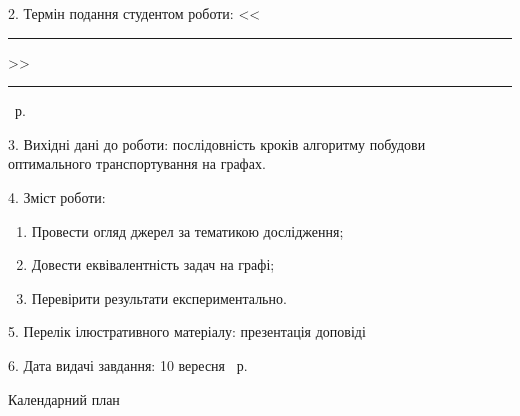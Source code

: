 2. Термін подання студентом роботи: <<\rule{0.5cm}{0.25pt}>> \rule{2.5cm}{0.25pt} \YearOfDefence~р.

3. Вихідні дані до роботи: послідовність кроків алгоритму побудови оптимального транспортування на графах. 

4. Зміст роботи: 
\begin{enumerate}[label=\arabic*)]
    \item Провести огляд джерел за тематикою дослідження;
    \item Довести еквівалентність задач на графі;
    \item Перевірити результати експериментально.
\end{enumerate} 

5. Перелік ілюстративного матеріалу: презентація доповіді

6. Дата видачі завдання: 10 вересня \YearOfBeginning~р.

\newpage

\begin{center}
Календарний план
\end{center}

